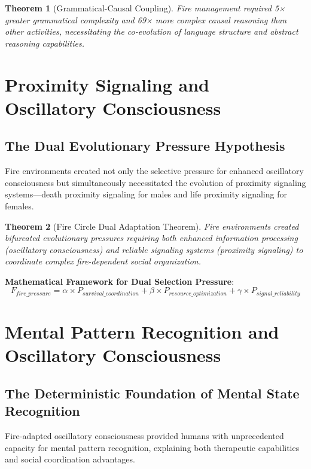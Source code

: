 \documentclass[11pt]{article}
\newtheorem{theorem}{Theorem}[section]
\theoremstyle{remark}
\begin{document}
\begin{theorem}[Grammatical-Causal Coupling]
Fire management required 5× greater grammatical complexity and 69× more complex causal reasoning than other activities, necessitating the co-evolution of language structure and abstract reasoning capabilities.
\end{theorem}

\section{Proximity Signaling and Oscillatory Consciousness}

\subsection{The Dual Evolutionary Pressure Hypothesis}

Fire environments created not only the selective pressure for enhanced oscillatory consciousness but simultaneously necessitated the evolution of proximity signaling systems—death proximity signaling for males and life proximity signaling for females.

\begin{theorem}[Fire Circle Dual Adaptation Theorem]
Fire environments created bifurcated evolutionary pressures requiring both enhanced information processing (oscillatory consciousness) and reliable signaling systems (proximity signaling) to coordinate complex fire-dependent social organization.
\end{theorem}

\textbf{Mathematical Framework for Dual Selection Pressure}:
$$F_{fire\_pressure} = \alpha \times P_{survival\_coordination} + \beta \times P_{resource\_optimization} + \gamma \times P_{signal\_reliability}$$

\section{Mental Pattern Recognition and Oscillatory Consciousness}

\subsection{The Deterministic Foundation of Mental State Recognition}

Fire-adapted oscillatory consciousness provided humans with unprecedented capacity for mental pattern recognition, explaining both therapeutic capabilities and social coordination advantages.
\end{document}
